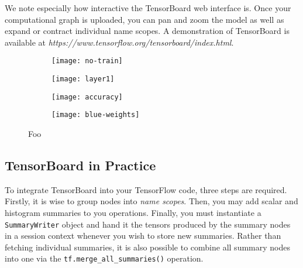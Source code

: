 We note especially how interactive the TensorBoard web interface is. Once your
computational graph is uploaded, you can pan and zoom the model as well as
expand or contract individual name scopes. A demonstration of TensorBoard is
available at \emph{https://www.tensorflow.org/tensorboard/index.html}.

\begin{figure}[h!]
  \centering
  \begin{subfigure}[h]{0.5\textwidth}
    \centering
    \texttt{[image: no-train]}
   \caption{}
   \label{fig:tensorboard-a}
  \end{subfigure}

  \vspace{0.3cm}

  \begin{subfigure}[h]{0.5\textwidth}
    \centering
    \texttt{[image: layer1]}
    \caption{}
    \label{fig:tensorboard-b}
  \end{subfigure}

  \vspace{0.3cm}

  \begin{subfigure}[h]{0.2\textwidth}
    \centering
    \texttt{[image: accuracy]}
    \caption{}
    \label{fig:tensorboard-c}
  \end{subfigure}
  \begin{subfigure}[h]{0.2\textwidth}
    \centering
    \texttt{[image: blue-weights]}
    \caption{}
    \label{fig:tensorboard-d}
  \end{subfigure}
  \caption{Foo}
  \label{fig:tensorboard}
\end{figure}

\subsection{TensorBoard in Practice}\label{sec:visual-code}

To integrate TensorBoard into your TensorFlow code, three steps are
required. Firstly, it is wise to group nodes into \emph{name scopes}. Then, you
may add scalar and histogram summaries to you operations. Finally, you must
instantiate a \texttt{SummaryWriter} object and hand it the tensors produced by
the summary nodes in a session context whenever you wish to store new
summaries. Rather than fetching individual summaries, it is also possible to
combine all summary nodes into one via the \texttt{tf.merge\_all\_summaries()}
operation.



